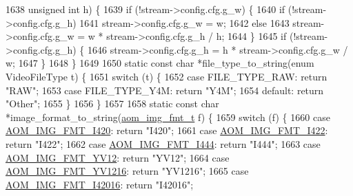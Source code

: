 \begin{DoxyCodeInclude}
{{{{{{{{{{{{{{{{{{{{{{{{{1638                                   \textcolor{keywordtype}{unsigned} \textcolor{keywordtype}{int} h) \{
1639   \textcolor{keywordflow}{if} (!stream->config.cfg.g\_w) \{
1640     \textcolor{keywordflow}{if} (!stream->config.cfg.g\_h)
1641       stream->config.cfg.g\_w = w;
1642     \textcolor{keywordflow}{else}
1643       stream->config.cfg.g\_w = w * stream->config.cfg.g\_h / h;
1644   \}
1645   \textcolor{keywordflow}{if} (!stream->config.cfg.g\_h) \{
1646     stream->config.cfg.g\_h = h * stream->config.cfg.g\_w / w;
1647   \}
1648 \}
1649 
1650 \textcolor{keyword}{static} \textcolor{keyword}{const} \textcolor{keywordtype}{char} *file\_type\_to\_string(\textcolor{keyword}{enum} VideoFileType t) \{
1651   \textcolor{keywordflow}{switch} (t) \{
1652     \textcolor{keywordflow}{case} FILE\_TYPE\_RAW: \textcolor{keywordflow}{return} \textcolor{stringliteral}{"RAW"};
1653     \textcolor{keywordflow}{case} FILE\_TYPE\_Y4M: \textcolor{keywordflow}{return} \textcolor{stringliteral}{"Y4M"};
1654     \textcolor{keywordflow}{default}: \textcolor{keywordflow}{return} \textcolor{stringliteral}{"Other"};
1655   \}
1656 \}
1657 
1658 \textcolor{keyword}{static} \textcolor{keyword}{const} \textcolor{keywordtype}{char} *image\_format\_to\_string(\hyperlink{aom__image_8h_ab71efff8c7f49380fad23b93bc2e9bfc}{aom\_img\_fmt\_t} f) \{
1659   \textcolor{keywordflow}{switch} (f) \{
1660     \textcolor{keywordflow}{case} \hyperlink{aom__image_8h_a930317c04b4bd0a660bb5e744055523cabd778a3d697463e89d12a1117f417b60}{AOM\_IMG\_FMT\_I420}: \textcolor{keywordflow}{return} \textcolor{stringliteral}{"I420"};
1661     \textcolor{keywordflow}{case} \hyperlink{aom__image_8h_a930317c04b4bd0a660bb5e744055523cab2f75281e94ebc0f0bc728ef287cd3e8}{AOM\_IMG\_FMT\_I422}: \textcolor{keywordflow}{return} \textcolor{stringliteral}{"I422"};
1662     \textcolor{keywordflow}{case} \hyperlink{aom__image_8h_a930317c04b4bd0a660bb5e744055523ca89d423506e948ab7d3b98b5750b92655}{AOM\_IMG\_FMT\_I444}: \textcolor{keywordflow}{return} \textcolor{stringliteral}{"I444"};
1663     \textcolor{keywordflow}{case} \hyperlink{aom__image_8h_a930317c04b4bd0a660bb5e744055523cad28244100a2754409f285b77a3db90a0}{AOM\_IMG\_FMT\_YV12}: \textcolor{keywordflow}{return} \textcolor{stringliteral}{"YV12"};
1664     \textcolor{keywordflow}{case} \hyperlink{aom__image_8h_a930317c04b4bd0a660bb5e744055523ca6d845490a6333fca3ac22cc1105deadd}{AOM\_IMG\_FMT\_YV1216}: \textcolor{keywordflow}{return} \textcolor{stringliteral}{"YV1216"};
1665     \textcolor{keywordflow}{case} \hyperlink{aom__image_8h_a930317c04b4bd0a660bb5e744055523ca20a9cf30277260685642b4cfb4e9273b}{AOM\_IMG\_FMT\_I42016}: \textcolor{keywordflow}{return} \textcolor{stringliteral}{"I42016"};
}}}}}}}}}}}}}}}}}}}}}}}}}
\end{DoxyCodeInclude}
